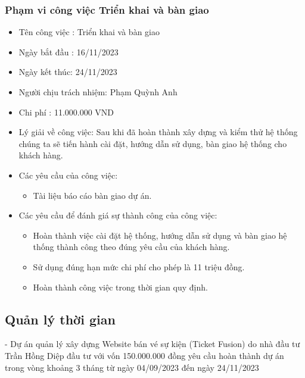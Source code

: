 \documentclass[12pt]{article}
\begin{document}
\subsubsection{Phạm vi công việc Triển khai và bàn giao}
\begin{itemize}[label=-, leftmargin=1cm]
    \item Tên công việc : Triển khai và bàn giao
    \item Ngày bắt đầu : 16/11/2023
    \item Ngày kết thúc: 24/11/2023
    \item Người chịu trách nhiệm: Phạm Quỳnh Anh
    \item Chi phí : 11.000.000 VND
    \item Lý giải về công việc: Sau khi đã hoàn thành xây dựng và kiểm thử hệ thống chúng ta sẽ tiến hành cài đặt, hướng dẫn sử dụng, bàn giao hệ thống cho khách hàng.
    \item Các yêu cầu của công việc:
    \begin{itemize}[label=+, leftmargin=1cm]
        \item Tài liệu báo cáo bàn giao dự án.
    \end{itemize}
    \item Các yêu cầu để đánh giá sự thành công của công việc:
    \begin{itemize}[label=+, leftmargin=1cm]
        \item Hoàn thành việc cài đặt hệ thống, hướng dẫn sử dụng và bàn giao hệ thống thành công theo đúng yêu cầu của khách hàng.
        \item Sử dụng đúng hạn mức chi phí cho phép là 11 triệu đồng.
        \item Hoàn thành công việc trong thời gian quy định.
    \end{itemize}
\end{itemize}

\subsection{Quản lý thời gian}
\hspace{1cm}- Dự án quản lý xây dựng Website bán vé sự kiện (Ticket Fusion) do nhà đầu tư Trần Hồng Diệp đầu tư với vốn 150.000.000 đồng yêu cầu hoàn thành dự án trong vòng khoảng 3 tháng từ ngày 04/09/2023 đến ngày 24/11/2023
\end{document}
